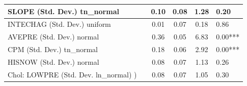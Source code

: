 \begin{table}
\begin{center}
\begin{tabular}{|l|l|c|c|c|l|}
			\hline
			SLOPE (Std. Dev.) tn_normal &  & 0.10 & 0.08 & 1.28 & 0.20 \\
			\hline
			INTECHAG (Std. Dev.) uniform &  & 0.01 & 0.07 & 0.18 & 0.86 \\
			\hline
			AVEPRE (Std. Dev.) normal &  & 0.36 & 0.05 & 6.83 & 0.00*** \\
			\hline
			CPM (Std. Dev.) tn_normal &  & 0.18 & 0.06 & 2.92 & 0.00*** \\
			\hline
			HISNOW (Std. Dev.) normal &  & 0.08 & 0.07 & 1.13 & 0.26 \\
			\hline
			 Chol: LOWPRE (Std. Dev. ln_normal) ) &  & 0.08 & 0.07 & 1.05 & 0.30 \\
			\hline
		\end{tabular}
	\end{center}
\end{table}